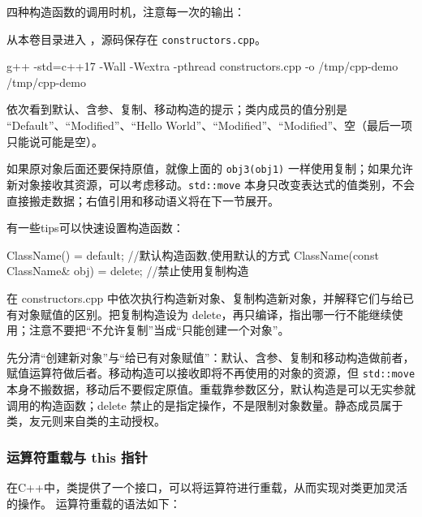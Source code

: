 \begin{example}
四种构造函数的调用时机，注意每一次的输出：



从本卷目录进入 ，源码保存在 \texttt{constructors.cpp}。
\begin{tbash}
g++ -std=c++17 -Wall -Wextra -pthread constructors.cpp -o /tmp/cpp-demo
/tmp/cpp-demo
\end{tbash}
依次看到默认、含参、复制、移动构造的提示；类内成员的值分别是 “Default”、“Modified”、“Hello World”、“Modified”、“Modified”、空（最后一项只能说可能是空）。
\end{example}

如果原对象后面还要保持原值，就像上面的 \texttt{obj3(obj1)} 一样使用复制；如果允许新对象接收其资源，可以考虑移动。\texttt{std::move} 本身只改变表达式的值类别，不会直接搬走数据；右值引用和移动语义将在下一节展开。

有一些tips可以快速设置构造函数：
\begin{tcode}
ClassName() = default;              //默认构造函数,使用默认的方式
ClassName(const ClassName& obj) = delete; //禁止使用复制构造
\end{tcode}

\begin{exercise}
\label{ex:v1-cpp-constructors}
在 constructors.cpp 中依次执行构造新对象、复制构造新对象，并解释它们与给已有对象赋值的区别。把复制构造设为 delete，再只编译，指出哪一行不能继续使用；注意不要把“不允许复制”当成“只能创建一个对象”。
\end{exercise}

\begin{conclusion}
先分清“创建新对象”与“给已有对象赋值”：默认、含参、复制和移动构造做前者，赋值运算符做后者。移动构造可以接收即将不再使用的对象的资源，但 \texttt{std::move} 本身不搬数据，移动后不要假定原值。重载靠参数区分，默认构造是可以无实参就调用的构造函数；delete 禁止的是指定操作，不是限制对象数量。静态成员属于类，友元则来自类的主动授权。
\end{conclusion}

\subsubsection{运算符重载与 this 指针}

在C++中，类提供了一个接口，可以将运算符进行重载，从而实现对类更加灵活的操作。
运算符重载的语法如下：

